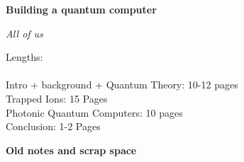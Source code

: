 \documentclass[a4paper]{article}
\begin{document}
\begin{center}
    \Huge \textbf{Building a quantum computer}
\end{center}
\vspace{-1em}

\begin{center}
    \emph{\large All of us}
\end{center}
\vspace{0.5em}
Lengths:\\ \\
Intro + background + Quantum Theory: 10-12 pages\\
Trapped Ions: 15 Pages\\
Photonic Quantum Computers: 10 pages\\
Conclusion: 1-2 Pages\\










\begin{center}
    \Huge \textbf{Old notes and scrap space}
\end{center}
\vspace{-1em}







\printbibliography
\end{document}

